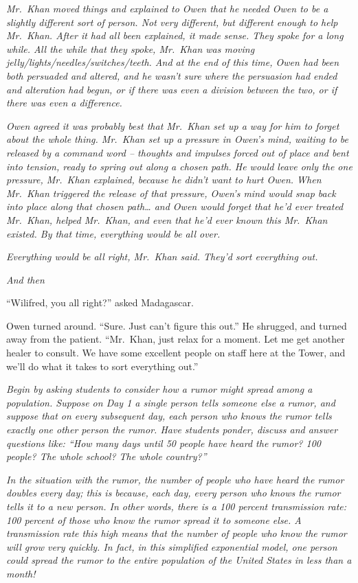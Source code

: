 \emph{Mr.~Khan moved things and explained to Owen that he needed Owen to
be a slightly different sort of person. Not very different, but
different enough to help Mr.~Khan. After it had all been explained, it
made sense. They spoke for a long while. All the while that they spoke,
Mr.~Khan was moving jelly/lights/needles/switches/teeth. And at the end
of this time, Owen had been both persuaded and altered, and he wasn't
sure where the persuasion had ended and alteration had begun, or if
there was even a division between the two, or if there was even a
difference.}

\emph{Owen agreed it was probably best that Mr.~Khan set up a way for
him to forget about the whole thing. Mr.~Khan set up a pressure in
Owen's mind, waiting to be released by a command word -- thoughts and
impulses forced out of place and bent into tension, ready to spring out
along a chosen path. He would leave only the one pressure, Mr.~Khan
explained, because he didn't want to hurt Owen. When Mr.~Khan triggered
the release of that pressure, Owen's mind would snap back into place
along that chosen path\ldots{} and Owen would forget that he'd ever
treated Mr.~Khan, helped Mr.~Khan, and even that he'd ever known this
Mr.~Khan existed. By that time, everything would be all over.}

\emph{Everything would be all right, Mr.~Khan said. They'd sort
everything out.}

\emph{And then}

``Wilifred, you all right?'' asked Madagascar.

Owen turned around. ``Sure. Just can't figure this out.'' He shrugged,
and turned away from the patient. ``Mr.~Khan, just relax for a moment.
Let me get another healer to consult. We have some excellent people on
staff here at the Tower, and we'll do what it takes to sort everything
out.''

\mybreak

\emph{Begin by asking students to consider how a rumor might spread
among a population. Suppose on Day 1 a single person tells someone else
a rumor, and suppose that on every subsequent day, each person who knows
the rumor tells exactly one other person the rumor. Have students
ponder, discuss and answer questions like: ``How many days until 50
people have heard the rumor? 100 people? The whole school? The whole
country?''}

\emph{In the situation with the rumor, the number of people who have
heard the rumor doubles every day; this is because, each day, every
person who knows the rumor tells it to a new person. In other words,
there is a 100 percent transmission rate: 100 percent of those who know
the rumor spread it to someone else. A transmission rate this high means
that the number of people who know the rumor will grow very quickly. In
fact, in this simplified exponential model, one person could spread the
rumor to the entire population of the United States in less than a
month!}

